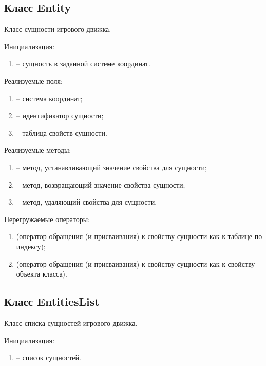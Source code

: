 \subsection{Класс Entity}
	\noindent Класс сущности игрового движка.

	\noindent Инициализация:
	\begin{enumerate}
		\item {} -- сущность в заданной системе координат.
	\end{enumerate}

	\noindent Реализуемые поля:
	\begin{enumerate}
		\item {} -- система координат;
		\item {} -- идентификатор сущности;
		\item {} -- таблица свойств сущности.
	\end{enumerate}

	\noindent Реализуемые методы:
	\begin{enumerate}
		\item {} -- метод, устанавливающий значение свойства для сущности;
		\item {} -- метод, возвращающий значение свойства сущности;
		\item {} -- метод, удаляющий свойства для сущности.
	\end{enumerate}

	\noindent Перегружаемые операторы:
	\begin{enumerate}
		\item {} (оператор обращения (и присваивания) к свойству сущности как к таблице по индексу);
		\item {} (оператор обращения (и присваивания) к свойству сущности как к свойству объекта класса).
	\end{enumerate}


\subsection{Класс EntitiesList}
	\noindent Класс списка сущностей игрового движка.

	\noindent Инициализация:
	\begin{enumerate}
		\item {} -- список сущностей.
	\end{enumerate}


